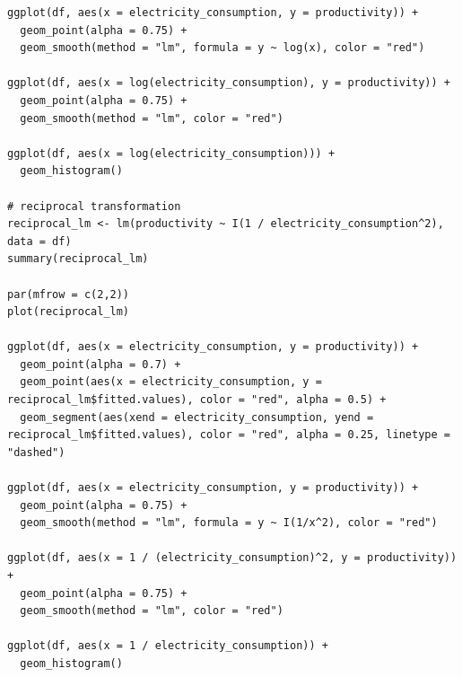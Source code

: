 \begin{verbatim}
ggplot(df, aes(x = electricity_consumption, y = productivity)) + 
  geom_point(alpha = 0.75) +
  geom_smooth(method = "lm", formula = y ~ log(x), color = "red")

ggplot(df, aes(x = log(electricity_consumption), y = productivity)) + 
  geom_point(alpha = 0.75) +
  geom_smooth(method = "lm", color = "red")

ggplot(df, aes(x = log(electricity_consumption))) +
  geom_histogram()

# reciprocal transformation
reciprocal_lm <- lm(productivity ~ I(1 / electricity_consumption^2), data = df)
summary(reciprocal_lm)

par(mfrow = c(2,2))
plot(reciprocal_lm)

ggplot(df, aes(x = electricity_consumption, y = productivity)) +
  geom_point(alpha = 0.7) +
  geom_point(aes(x = electricity_consumption, y = reciprocal_lm$fitted.values), color = "red", alpha = 0.5) +
  geom_segment(aes(xend = electricity_consumption, yend = reciprocal_lm$fitted.values), color = "red", alpha = 0.25, linetype = "dashed")

ggplot(df, aes(x = electricity_consumption, y = productivity)) + 
  geom_point(alpha = 0.75) +
  geom_smooth(method = "lm", formula = y ~ I(1/x^2), color = "red")

ggplot(df, aes(x = 1 / (electricity_consumption)^2, y = productivity)) + 
  geom_point(alpha = 0.75) +
  geom_smooth(method = "lm", color = "red")

ggplot(df, aes(x = 1 / electricity_consumption)) + 
  geom_histogram()
\end{verbatim}